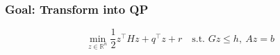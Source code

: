 \subsubsection{Goal: Transform  into QP}
\[
  \min_{z\in\mathbb{R}^n}
  \textstyle\frac{1}{2}z^\top H z + q^\top z + r
\quad\text{s.t. }Gz\leq h,\ Az = b\]
%
%
%
%
%
%
%
